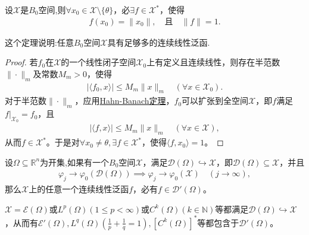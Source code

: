 \documentclass[../../main.tex]{subfiles}%
\begin{document}
\begin{theorem}\label{theorem:任意B0空集中必存在足够多的连续线性泛函}
设$\mathscr{X}$是$B_0$空间,则$\forall x_0 \in \mathscr{X} \setminus \{\theta\}$，必$\exists f \in \mathscr{X}^*$，使得
\begin{align*}
f(x_0) = \|x_0\|, \quad \text{且} \quad \|f\| = 1.
\end{align*}
\end{theorem}
\begin{remark}
这个定理说明:任意$B_0$空间$\mathscr{X}$具有足够多的连续线性泛函.
\end{remark}
\begin{proof}

若$f_0$在$\mathscr{X}$的一个线性闭子空间$\mathscr{X}_0$上有定义且连续线性，则存在半范数$\|\cdot\|_m$及常数$M_m>0$，使得
\begin{align*}
|\langle f_0,x\rangle|\leqslant M_m\|x\|_m\quad(\forall x\in\mathscr{X}_0).
\end{align*}
对于半范数$\|\cdot\|_m$，应用\hyperref[theorem:泛函分析--(哈恩-巴拿赫)Hahn-Banach定理]{Hahn-Banach定理}，$f_0$可以扩张到全空间$\mathscr{X}$，即$f$满足$f|_{\mathscr{X}_0}=f_0$，且
\begin{align*}
|\langle f,x\rangle|\leqslant M_m\|x\|_m\quad(\forall x\in\mathscr{X}),
\end{align*}
从而$f\in\mathscr{X}^*$。于是对$\forall x_0\neq\theta,\exists f\in\mathscr{X}^*$，使得$\langle f,x_0\rangle=1$。
\end{proof}

\begin{proposition}
设$\Omega\subseteq\mathbb{R}^n$为开集,如果有一个$B_0$空间$\mathscr{X}$，满足$\mathscr{D}(\Omega)\hookrightarrow\mathscr{X}$，即$\mathscr{D}(\Omega)\subseteq\mathscr{X}$，并且
\begin{align*}
\varphi_j\to\varphi_0(\mathscr{D}(\Omega))\implies\varphi_j\to\varphi_0(\mathscr{X})\quad(j\to\infty),
\end{align*}
那么$\mathscr{X}$上的任意一个连续线性泛函$f$，必有$f\in\mathscr{D}'(\Omega)$。
\end{proposition}

\begin{example}
$\mathscr{X}=\mathscr{E}(\Omega)$或$L^p(\Omega)(1\leqslant p<\infty)$或$C^k(\Omega)(k\in\mathbb{N})$等都满足$\mathscr{D}(\Omega)\hookrightarrow\mathscr{X}$，从而有$\mathscr{E}'(\Omega),L^q(\Omega)(\frac{1}{p}+\frac{1}{q}=1),[C^k(\Omega)]^*$等都包含于$\mathscr{D}'(\Omega)$。
\end{example}
\end{document}
